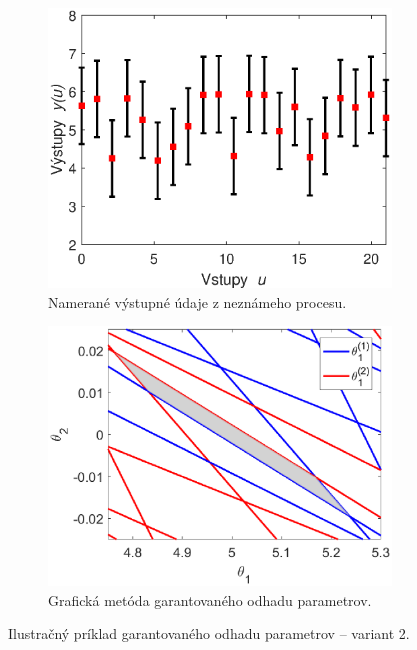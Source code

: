 \begin{figure}
	\centering
	\begin{subfigure}[b]{0.48\textwidth}
		\centering
		\includegraphics[width=\linewidth]{images/gpe_ex_data2}
		\caption{Namerané výstupné údaje z neznámeho procesu.}
		\label{gpe_ex2_data}
	\end{subfigure}
	\begin{subfigure}[b]{0.48\textwidth}
		\centering
		\includegraphics[width=\linewidth]{images/gpe_ex_line2}
		\caption{Grafická metóda garantovaného odhadu parametrov.}
		\label{gpe_ex2_gm}
	\end{subfigure}
	\caption{Ilustračný príklad garantovaného odhadu parametrov -- variant 2.}
	\label{gpe_ex2}
\end{figure}

